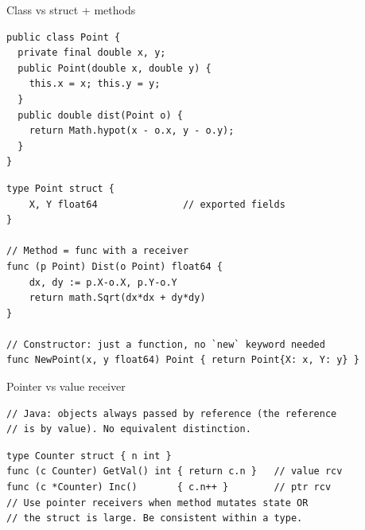 \documentclass[10pt]{article}
\begin{document}
\begin{construct}{Class vs struct + methods}
\noindent
\begin{minipage}[t]{0.485\linewidth}
\begin{lstlisting}[style=java, title=Java]
public class Point {
  private final double x, y;
  public Point(double x, double y) {
    this.x = x; this.y = y;
  }
  public double dist(Point o) {
    return Math.hypot(x - o.x, y - o.y);
  }
}
\end{lstlisting}
\end{minipage}\hfill
\begin{minipage}[t]{0.485\linewidth}
\begin{lstlisting}[style=go, title=Go]
type Point struct {
    X, Y float64               // exported fields
}

// Method = func with a receiver
func (p Point) Dist(o Point) float64 {
    dx, dy := p.X-o.X, p.Y-o.Y
    return math.Sqrt(dx*dx + dy*dy)
}

// Constructor: just a function, no `new` keyword needed
func NewPoint(x, y float64) Point { return Point{X: x, Y: y} }
\end{lstlisting}
\end{minipage}
\end{construct}

\begin{construct}{Pointer vs value receiver}
\noindent
\begin{minipage}[t]{0.485\linewidth}
\begin{lstlisting}[style=java, title=Java]
// Java: objects always passed by reference (the reference
// is by value). No equivalent distinction.
\end{lstlisting}
\end{minipage}\hfill
\begin{minipage}[t]{0.485\linewidth}
\begin{lstlisting}[style=go, title=Go]
type Counter struct { n int }
func (c Counter) GetVal() int { return c.n }   // value rcv
func (c *Counter) Inc()       { c.n++ }        // ptr rcv
// Use pointer receivers when method mutates state OR
// the struct is large. Be consistent within a type.
\end{lstlisting}
\end{minipage}
\end{construct}
\end{document}
